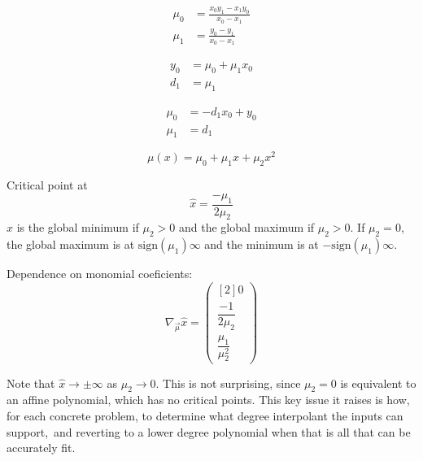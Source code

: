  
\begin{align}
  \mu_0 & = \frac
{x_0 y_1 - x_1 y_0}
{x_0 - x_1} \\
   \mu_1 & = \frac
{y_0 - y_1}
{x_0 - x_1} 
\end{align}


\begin{align}
  y_0 & = \mu_0+\mu_1 x_0  \\
   d_1 & = \mu_1  
\end{align}

 
\begin{align}
  \mu_0 & =  - d_1 x_0+y_0  \\
   \mu_1 & = d_1  
\end{align}


\begin{equation}
\mu(x) = \mu_0 + \mu_1 x + \mu_2 x^2
\end{equation}

Critical point at
\begin{equation}
\hat{x} = \frac{- \mu_1}{2 \mu_2}
\end{equation}
$\hat{x}$ is the global minimum if $\mu_2>0$ 
and the global maximum if $\mu_2>0$.
If $\mu_2 = 0$, the global maximum is at 
$\text{sign}(\mu_1)\infty$
and the minimum is at $-\text{sign}(\mu_1)\infty$.

Dependence on monomial coeficients:
\begin{equation}
\nabla_{\vec{\mu}} \hat{x} =
\begin{pmatrix}[2]
0 
\\
\dfrac{-1}{2 \mu_2} 
\\
\dfrac{\mu_1}{\mu_2^2}
\end{pmatrix}
\end{equation}

Note that $\hat{x} \to  \pm \infty$ as $\mu_2 \to 0$. 
This is not surprising, since $\mu_2 = 0$ is equivalent to
an affine polynomial, which has no critical points.
This key issue it raises is how, for each concrete problem,
to determine what degree interpolant the inputs can support,\
and reverting to a lower degree polynomial when that is all that
can be accurately fit.

\leveldown{Input: $(x_0,y_0), (x_1,y_1), (x_2,y_2)$}
\label{sec:monomial-yyy}

